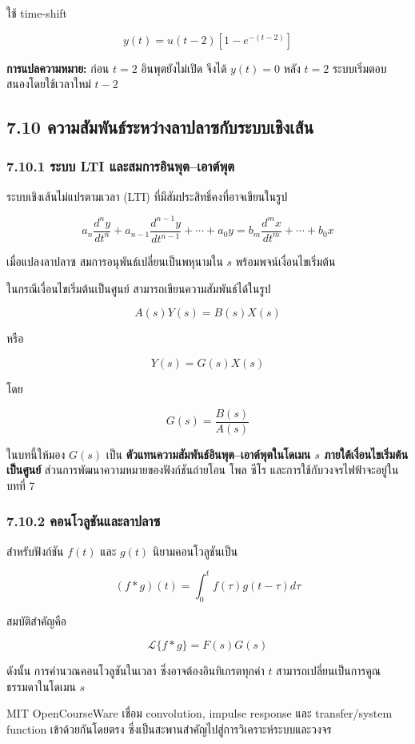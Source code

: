 ใช้ time-shift

\[
\boxed{y(t)=u(t-2)\left[1-e^{-(t-2)}\right]}
\]

\textbf{การแปลความหมาย:} ก่อน $t=2$ อินพุตยังไม่เปิด จึงได้ $y(t)=0$ หลัง $t=2$ ระบบเริ่มตอบสนองโดยใช้เวลาใหม่ $t-2$



\subsection{7.10 ความสัมพันธ์ระหว่างลาปลาซกับระบบเชิงเส้น}

\subsubsection{7.10.1 ระบบ LTI และสมการอินพุต–เอาต์พุต}

ระบบเชิงเส้นไม่แปรตามเวลา (LTI) ที่มีสัมประสิทธิ์คงที่อาจเขียนในรูป

\[
a_n\frac{d^ny}{dt^n}+a_{n-1}\frac{d^{n-1}y}{dt^{n-1}}+\cdots+a_0y = b_m\frac{d^mx}{dt^m}+\cdots+b_0x
\]

เมื่อแปลงลาปลาซ สมการอนุพันธ์เปลี่ยนเป็นพหุนามใน $s$ พร้อมพจน์เงื่อนไขเริ่มต้น

ในกรณีเงื่อนไขเริ่มต้นเป็นศูนย์ สามารถเขียนความสัมพันธ์ได้ในรูป

\[
A(s)Y(s)=B(s)X(s)
\]

หรือ

\[
\boxed{Y(s)=G(s)X(s)}
\]

โดย

\[
G(s)=\frac{B(s)}{A(s)}
\]

ในบทนี้ให้มอง $G(s)$ เป็น \textbf{ตัวแทนความสัมพันธ์อินพุต–เอาต์พุตในโดเมน $s$ ภายใต้เงื่อนไขเริ่มต้นเป็นศูนย์} ส่วนการพัฒนาความหมายของฟังก์ชันถ่ายโอน โพล ซีโร และการใช้กับวงจรไฟฟ้าจะอยู่ในบทที่ 7

\subsubsection{7.10.2 คอนโวลูชันและลาปลาซ}

สำหรับฟังก์ชัน $f(t)$ และ $g(t)$ นิยามคอนโวลูชันเป็น

\[
\boxed{(f*g)(t)=\int_0^t f(\tau)g(t-\tau)d\tau}
\]

สมบัติสำคัญคือ

\[
\boxed{\mathcal{L}\{f*g\}=F(s)G(s)}
\]

ดังนั้น การคำนวณคอนโวลูชันในเวลา ซึ่งอาจต้องอินทิเกรตทุกค่า $t$ สามารถเปลี่ยนเป็นการคูณธรรมดาในโดเมน $s$

MIT OpenCourseWare เชื่อม convolution, impulse response และ transfer/system function เข้าด้วยกันโดยตรง ซึ่งเป็นสะพานสำคัญไปสู่การวิเคราะห์ระบบและวงจร

